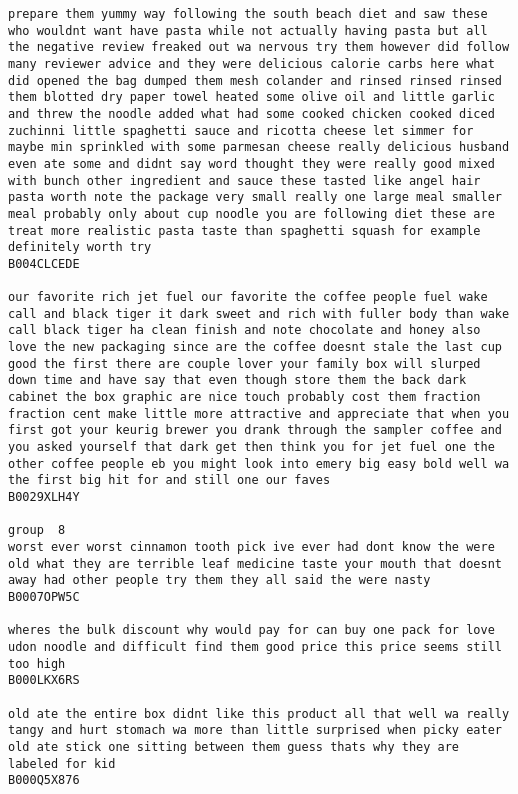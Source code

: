 \documentclass[11pt]{article}
\begin{document}
\begin{Verbatim}[commandchars=\\\{\}]
prepare them yummy way following the south beach diet and saw these who wouldnt want have pasta while not actually having pasta but all the negative review freaked out wa nervous try them however did follow many reviewer advice and they were delicious calorie carbs here what did opened the bag dumped them mesh colander and rinsed rinsed rinsed them blotted dry paper towel heated some olive oil and little garlic and threw the noodle added what had some cooked chicken cooked diced zuchinni little spaghetti sauce and ricotta cheese let simmer for maybe min sprinkled with some parmesan cheese really delicious husband even ate some and didnt say word thought they were really good mixed with bunch other ingredient and sauce these tasted like angel hair pasta worth note the package very small really one large meal smaller meal probably only about cup noodle you are following diet these are treat more realistic pasta taste than spaghetti squash for example definitely worth try
B004CLCEDE

our favorite rich jet fuel our favorite the coffee people fuel wake call and black tiger it dark sweet and rich with fuller body than wake call black tiger ha clean finish and note chocolate and honey also love the new packaging since are the coffee doesnt stale the last cup good the first there are couple lover your family box will slurped down time and have say that even though store them the back dark cabinet the box graphic are nice touch probably cost them fraction fraction cent make little more attractive and appreciate that when you first got your keurig brewer you drank through the sampler coffee and you asked yourself that dark get then think you for jet fuel one the other coffee people eb you might look into emery big easy bold well wa the first big hit for and still one our faves
B0029XLH4Y

group  8
worst ever worst cinnamon tooth pick ive ever had dont know the were old what they are terrible leaf medicine taste your mouth that doesnt away had other people try them they all said the were nasty
B0007OPW5C

wheres the bulk discount why would pay for can buy one pack for love udon noodle and difficult find them good price this price seems still too high
B000LKX6RS

old ate the entire box didnt like this product all that well wa really tangy and hurt stomach wa more than little surprised when picky eater old ate stick one sitting between them guess thats why they are labeled for kid
B000Q5X876


\end{Verbatim}
\end{document}
